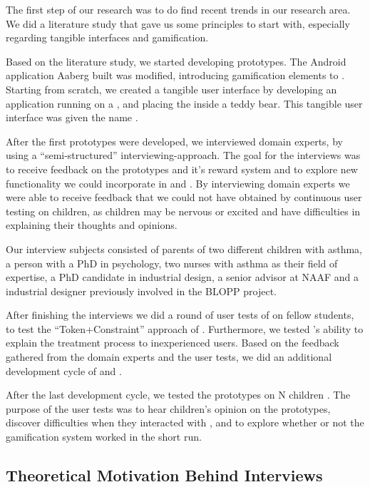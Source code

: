 The first step of our research was to do find recent trends in our research area. We did a literature study that gave us some principles to start with, especially regarding tangible interfaces and gamification. 
 
Based on the literature study, we started developing prototypes. The Android application Aaberg \etal{} built was modified, introducing gamification elements to \app{}. Starting from scratch, we created a tangible user interface by developing an application running on a \rpi{}, and placing the \rpi{} inside a teddy bear. This tangible user interface was given the name \ab{}.       

After the first prototypes were developed, we interviewed domain experts, by using a ``semi-structured'' interviewing-approach. The goal for the interviews was to receive feedback on the prototypes and it's reward system and to explore new functionality we could incorporate in \ab{} and \app{}. By interviewing domain experts we were able to receive feedback that we could not have obtained by continuous user testing on children, as children may be nervous or excited and have difficulties in explaining their thoughts and opinions.  

Our interview subjects consisted of parents of two different children with asthma, a person with a PhD in psychology, two nurses with asthma as their field of expertise, a PhD candidate in industrial design, a senior advisor at NAAF and a industrial designer previously involved in the BLOPP project. 

After finishing the interviews we did a round of user tests of \ab{} on fellow students, to test the ``Token+Constraint'' approach of \ab{}. Furthermore, we tested \ab{}'s ability to explain the treatment process to inexperienced users. Based on the feedback gathered from the domain experts and the user tests, we did an additional development cycle of \ab{} and \app{}.

After the last development cycle, we tested the prototypes on N children \iref{}. The purpose of the user tests was to hear children's opinion on the prototypes, discover difficulties when they interacted with \ab{}, and to explore whether or not the gamification system worked in the short run.  



\subsection{Theoretical Motivation Behind Interviews}
\label{sec:motivationbehindinterviews}


